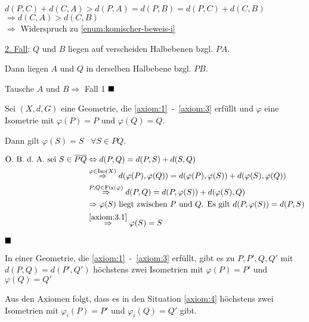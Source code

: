 \begin{beweis}
\begin{enumerate}[label=(\roman*)]
\begin{enumerate}[label=\alph*)]
                      $d(P,C) + d(C,A) > d(P,A) = d(P,B) = d(P,C) + d(C, B)$\\
                      $\Rightarrow d(C, A) > d(C, B)$\\
                      $\Rightarrow$ Widerspruch zu \ref{enum:komischer-beweis-i}
            \end{enumerate}
    \end{enumerate}

    \underline{2. Fall}: $Q$ und $B$ liegen auf verscheiden Halbebenen bzgl. $PA$.

    Dann liegen $A$ und $Q$ in derselben Halbebene bzgl. $PB$.

    Tausche $A$ und $B \Rightarrow$  Fall 1 $\qed$
\end{beweis}

\begin{bemerkung}\label{kor:beh2'}
    Sei $(X, d, G)$ eine Geometrie, die \ref{axiom:1}~-~\ref{axiom:3}
    erfüllt und $\varphi$ eine Isometrie mit $\varphi(P) = P$ und $\varphi(Q) = Q$.

    Dann gilt $\varphi(S) = S\;\;\;\forall S \in PQ$.
\end{bemerkung}

\begin{beweis}
    \begin{align}
        \text{\Obda sei } S \in \overline{PQ} &\Leftrightarrow d(P,Q) = d(P,S) + d(S,Q)\\
        &\overset{\varphi \in \Iso(X)}{\Rightarrow} d(\varphi(P),\varphi(Q)) = d(\varphi(P),\varphi(S)) + d(\varphi(S),\varphi(Q))\\
        &\overset{P, Q \in \Fix(\varphi)}{\Rightarrow} d(P, Q) = d(P,\varphi(S)) + d(\varphi(S), Q)\\
        &\Rightarrow \varphi(S) \text{ liegt zwischen } P \text{ und } Q \text{. Es gilt } d(P, \varphi(S)) = d(P,S)\\
        &\overset{\ref{axiom:3.1}}{\Rightarrow} \varphi(S) = S
    \end{align}

    $\qed$ 
\end{beweis}

\begin{proposition}%
    In einer Geometrie, die \ref{axiom:1}~-~\ref{axiom:3} erfüllt,
    gibt es zu $P, P', Q, Q'$ mit $d(P, Q) = d(P', Q')$ höchstens
    zwei Isometrien mit $\varphi(P) = P'$ und $\varphi(Q) = Q'$

    Aus den Axiomen  folgt, dass es in 
    den Situation \ref{axiom:4} höchstens zwei Isometrien mit
    $\varphi_i(P) = P'$ und $\varphi_i(Q) = Q'$ gibt.
\end{proposition}

